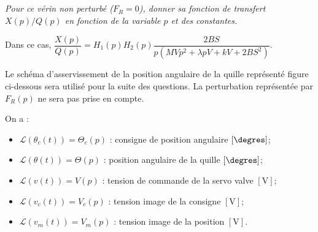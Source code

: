 \begin{multicols}{2}
\subparagraph{}\textit{Pour ce vérin non perturbé ($F_R=0$), donner sa fonction de transfert $X(p)/Q(p)$ en fonction de la variable $p$ et des constantes.}
\ifprof
\begin{corrige}
Dans ce cas, $\dfrac{X(p)}{Q(p)}=H_1(p)H_2(p)\dfrac{2BS}{p\left(MVp^2  +\lambda pV  + kV+ 2BS^2\right) }$.
\end{corrige}
\else
\fi

\ifprof
\else
Le schéma d’asservissement de la position angulaire de la quille représenté figure ci-dessous sera utilisé
pour la suite des questions. La perturbation représentée par $F_R(p)$ ne sera pas prise en compte.

\footnotesize
\begin{center}
\end{center}

\normalsize


On a :
\begin{itemize}
\item $\mathcal{L}\left(\theta_c(t)\right)=\Theta_c(p)$ : consigne de position angulaire $\left[\degres\right]$;
\item $\mathcal{L}\left(\theta(t)\right)=\Theta(p)$ : position angulaire de la quille $\left[\degres\right]$;
\item $\mathcal{L}\left(v(t)\right)=V(p)$ : tension de commande de la servo valve $\left[\text{V}\right]$;
\item $\mathcal{L}\left(v_c(t)\right)=V_c(p)$ : tension image de la consigne $\left[\text{V}\right]$;
\item $\mathcal{L}\left(v_m(t)\right)=V_m(p)$ : tension image de la position $\left[\text{V}\right]$.
\end{itemize}


\end{multicols}
